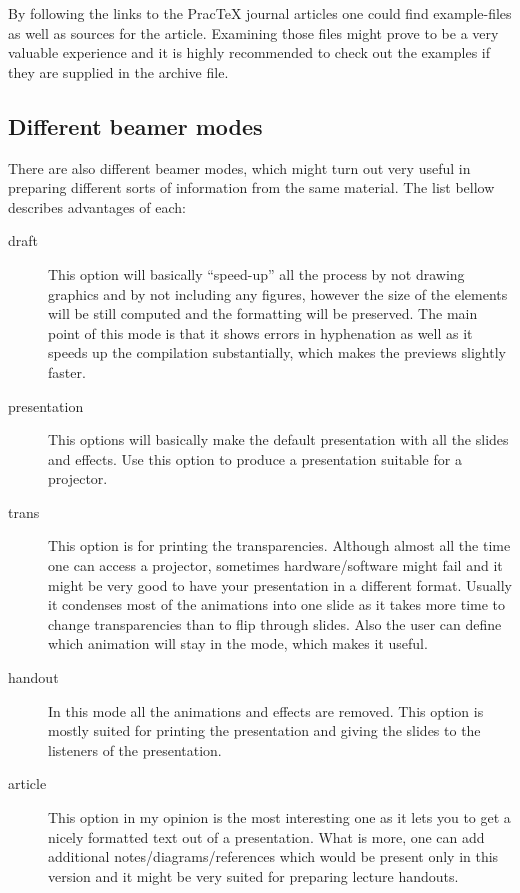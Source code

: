 \documentclass[
]{scrartcl}
\begin{document}
%
By following the links to the Prac\TeX{} journal articles one could find
    example-files as well as sources for the article.
%
Examining those files might prove to be a very valuable experience and it is
    highly recommended to check out the examples if they are supplied in the
    archive file.

%
\subsection{Different beamer modes}
%
There are also different beamer modes, which might turn out very useful in
    preparing different sorts of information from the same material.
%
The list bellow describes advantages of each:
\begin{description}
    \item[draft]
        This option will basically ``speed-up'' all the process by not drawing
            graphics and by not including any figures, however the size of the
            elements will be still computed and the formatting will be
            preserved.
        The main point of this mode is that it shows errors in hyphenation as
            well as it speeds up the compilation substantially, which makes the
            previews slightly faster.
    \item[presentation]
        This options will basically make the default presentation with all the
            slides and effects.
        Use this option to produce a presentation suitable for a projector.
    \item[trans]
        This option is for printing the transparencies.
        Although almost all the time one can access a projector, sometimes
            hardware/software might fail and it might be very good to have your
            presentation in a different format.
        Usually it condenses most of the animations into one slide as it takes
            more time to change transparencies than to flip through slides.
        Also the user can define which animation will stay in the 
            mode, which makes it useful.
    \item[handout]
        In this mode all the animations and effects are removed.
        This option is mostly suited for printing the presentation and giving
            the slides to the listeners of the presentation.
    \item[article]
        This option in my opinion is the most interesting one as it lets you to
            get a nicely formatted text out of a presentation.
        What is more, one can add additional notes/diagrams/references which
            would be present only in this version and it might be very suited
            for preparing lecture handouts.
\end{description}
\end{document}
